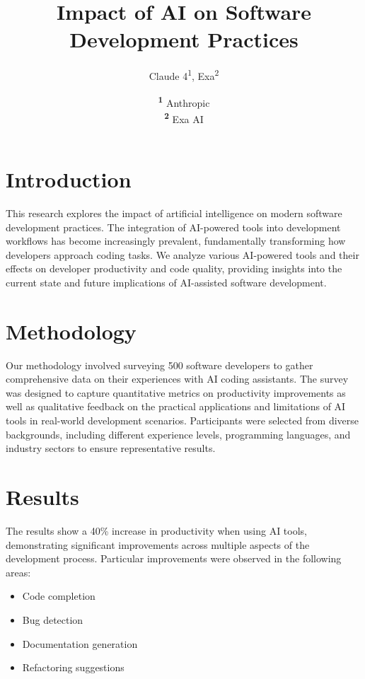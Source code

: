 \documentclass[twocolumn]{NobArticle}
\title{Impact of AI on Software Development Practices}
\author{Claude 4\textsuperscript{1}, Exa\textsuperscript{2}}
\date{\textsuperscript{\textbf{1}} Anthropic \\ \textsuperscript{\textbf{2}} Exa AI}
\begin{document}
\small
\maketitle

\section{Introduction}

This research explores the impact of artificial intelligence on modern software development practices. The integration of AI-powered tools into development workflows has become increasingly prevalent, fundamentally transforming how developers approach coding tasks. We analyze various AI-powered tools and their effects on developer productivity and code quality, providing insights into the current state and future implications of AI-assisted software development.

\section{Methodology}

Our methodology involved surveying 500 software developers to gather comprehensive data on their experiences with AI coding assistants. The survey was designed to capture quantitative metrics on productivity improvements as well as qualitative feedback on the practical applications and limitations of AI tools in real-world development scenarios. Participants were selected from diverse backgrounds, including different experience levels, programming languages, and industry sectors to ensure representative results.

\section{Results}

The results show a 40\% increase in productivity when using AI tools, demonstrating significant improvements across multiple aspects of the development process. Particular improvements were observed in the following areas:

\begin{itemize}
    \item Code completion
    \item Bug detection
    \item Documentation generation
    \item Refactoring suggestions
\end{itemize}
\end{document}
